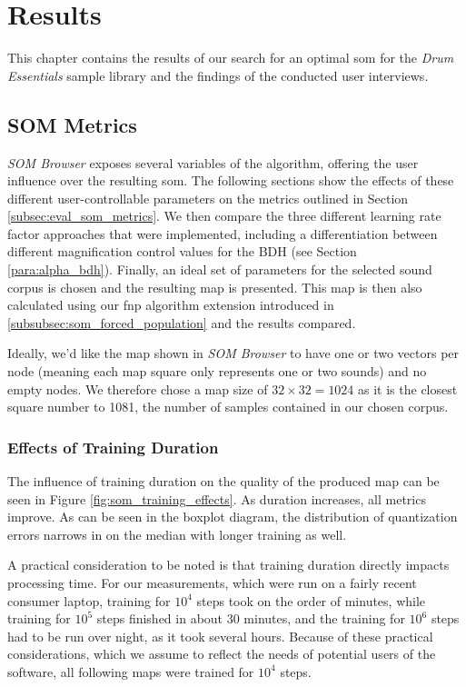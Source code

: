 
\section{Results}
\label{sec:results}
This chapter contains the results of our search for an optimal \gls{som} for the
\textit{Drum Essentials} sample library and the findings of the conducted user
interviews.

\subsection{SOM Metrics}
\label{subsec:results_som_metrics}
\textit{SOM Browser} exposes several variables of the algorithm, offering the
user influence over the resulting \gls{som}. The following sections show the
effects of these different user-controllable parameters on the metrics outlined
in Section \ref{subsec:eval_som_metrics}.
We then compare the three different learning rate factor approaches that were
implemented, including a differentiation between different magnification control
values for the BDH (see Section \ref{para:alpha_bdh}).
Finally, an ideal set of parameters for the selected sound corpus is chosen and
the resulting map is presented.
This map is then also calculated using our \gls{fnp} algorithm
extension introduced in \ref{subsubsec:som_forced_population} and the results
compared.

\smallskip

Ideally, we'd like the map shown in \textit{SOM Browser} to have one
or two vectors per node (meaning each map square only represents one or two
sounds) and no empty nodes. We therefore chose a map size of
$32 \times 32 = 1024$ as it is the closest square number to 1081, the number
of samples contained in our chosen corpus.

\subsubsection{Effects of Training Duration}
\label{subsubsec:som_training_effects}
The influence of training duration on the quality of the produced map can be
seen in Figure \ref{fig:som_training_effects}. As duration increases, all
metrics improve. As can be seen in the boxplot diagram, the distribution of
quantization errors narrows in on the median with longer training as well.

\smallskip

A practical consideration to be noted is that training duration
directly impacts processing time. For our measurements, which were run on a
fairly recent consumer laptop, training for $10^4$ steps took on the order of
minutes, while training for $10^5$ steps finished in about 30 minutes, and
the training for $10^6$ steps had to be run over night, as it took several
hours. Because of these practical considerations, which we assume to reflect
the needs of potential users of the software, all following maps were trained
for $10^4$ steps.

